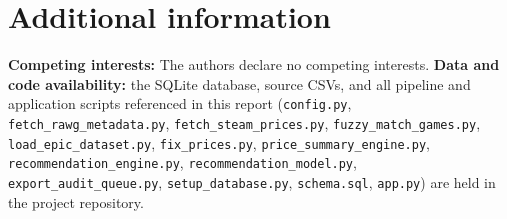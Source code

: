 \documentclass[fleqn,10pt]{wlscirep}
\begin{document}
\section*{Additional information}

\textbf{Competing interests:} The authors declare no competing interests. \textbf{Data and code availability:} the SQLite database, source CSVs, and all pipeline and application scripts referenced in this report (\texttt{config.py}, \texttt{fetch\_rawg\_metadata.py}, \texttt{fetch\_steam\_prices.py}, \texttt{fuzzy\_match\_games.py}, \texttt{load\_epic\_dataset.py}, \texttt{fix\_prices.py}, \texttt{price\_summary\_engine.py}, \texttt{recommendation\_engine.py}, \texttt{recommendation\_model.py}, \texttt{export\_audit\_queue.py}, \texttt{setup\_database.py}, \texttt{schema.sql}, \texttt{app.py}) are held in the project repository.


\end{document}
